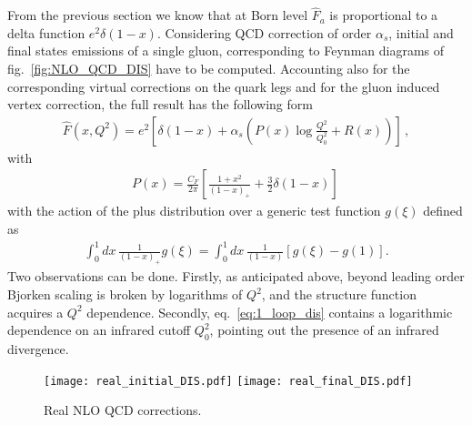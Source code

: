 %
From the previous section we know that at Born level $\hat{F}_a$ is proportional
to a delta function $e^2\delta\left(1-x\right)$. 
Considering QCD correction of order $\alpha_s$,
initial and final states emissions of a single gluon, corresponding to Feynman diagrams of fig.~\eqref{fig:NLO_QCD_DIS}
have to be computed. 
Accounting also for the corresponding virtual corrections on the quark legs
and for the gluon induced vertex correction, the full result has the following form
\begin{align}
    \label{eq:1_loop_dis}
    \hat{F}\left(x,Q^2\right) = e^2\left[\delta\left(1-x\right) 
    + \alpha_s\left(P\left(x\right)\log\frac{Q^2}{Q_0^2} + R\left(x\right) \right)  \right]\,,
\end{align}
with
\begin{align}
    \label{eq:splitting_function}
    P\left(x\right) = \frac{C_F}{2\pi}\left[\frac{1+x^2}{\left(1-x\right)_+} + \frac{3}{2}\delta\left(1-x\right)\right]\,
\end{align}
with the action of the plus distribution over a generic test function $g\left(\xi\right)$ defined as
\begin{align}
	\label{eq:plus}
	\int_0^1 dx\,\frac{1}{\left(1-x\right)_+}g\left(\xi\right) = \int_0^1 dx\,\frac{1}{\left(1-x\right)}\left[g\left(\xi\right) - g\left(1\right)\right].
\end{align}
Two observations can be done. Firstly, as anticipated above, beyond leading order
Bjorken scaling is broken by logarithms of $Q^2$, and the structure function acquires a $Q^2$ dependence.
Secondly, eq.~\eqref{eq:1_loop_dis} contains a logarithmic dependence on an infrared cutoff $Q_0^2$, pointing out 
the presence of an infrared divergence.
\begin{figure}[h]
    \centering
    \texttt{[image: real\_initial\_DIS.pdf]}
    \texttt{[image: real\_final\_DIS.pdf]}
    \caption{Real NLO QCD corrections.}
    \label{fig:NLO_QCD_DIS}
\end{figure}

